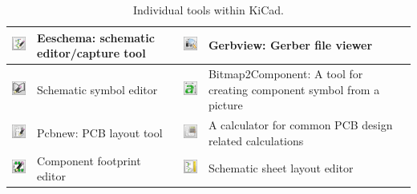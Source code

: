\documentclass[12pt,letterpaper]{scrartcl}
\begin{document}
\begin{table}[ht]
\caption{Individual tools within KiCad.}
\begin{tabular}{|m{0.5in}|m{2in}||m{0.5in}|m{2in}|}
\hline \includegraphics[width=0.5in]{eeschema-icon}  &   Eeschema: schematic editor/capture tool & \includegraphics[width=0.5in]{gerbview-icon} &  Gerbview: Gerber file viewer\\ 

\hline \includegraphics[width=0.5in]{sche-lib-icon} &  Schematic symbol editor & \includegraphics[width=0.5in]{bitmap2component-icon} &  Bitmap2Component: A tool for creating component symbol from a picture\\ 

\hline \includegraphics[width=0.5in]{pcbnew-icon} &  Pcbnew: PCB layout tool & \includegraphics[width=0.5in]{calculator-icon} &  A calculator for common PCB design related calculations\\ 

\hline \includegraphics[width=0.5in]{footprint-lib-icon} &  Component footprint editor & \includegraphics[width=0.5in]{pi-editor-icon} &  Schematic sheet layout editor\\ 
\hline 
\end{tabular} 
\end{table}
\end{document}
